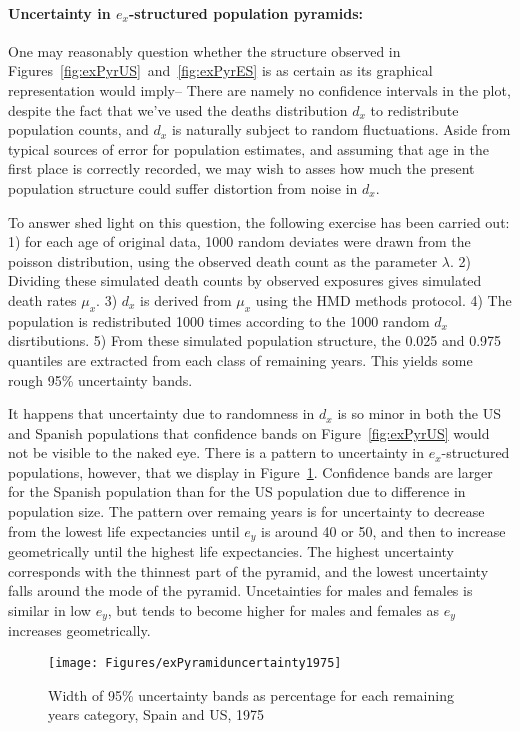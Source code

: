 \paragraph{Uncertainty in $e_x$-structured population pyramids:} One may
reasonably question whether the structure observed in
Figures~\ref{fig:exPyrUS}~and~\ref{fig:exPyrES} is as certain as its graphical
representation would imply-- There are namely no confidence intervals in the
plot, despite the fact that we've used the deaths distribution $d_x$ to
redistribute population counts, and $d_x$ is naturally subject to random
fluctuations. Aside from typical sources of error for population estimates, and
assuming that age in the first place is correctly recorded, we may wish to asses
how much the present population structure could suffer distortion from noise in
$d_x$. 

To answer shed light on this question, the following exercise has been
carried out: 1) for each age of original data, 1000 random deviates were drawn
from the poisson distribution, using the observed death count as the parameter
$\lambda$. 2) Dividing these simulated death counts by observed exposures gives
simulated death rates $\mu_x$. 3) $d_x$ is derived from $\mu_x$ using the HMD
methods protocol. 4) The population is redistributed 1000 times according to the
1000 random $d_x$ disrtibutions. 5) From these simulated population structure,
the 0.025 and 0.975 quantiles are extracted from each class of remaining years.
This yields some rough 95\% uncertainty bands.

It happens that uncertainty due to randomness in $d_x$ is so minor in both the
US and Spanish populations that confidence bands on Figure~\ref{fig:exPyrUS}
would not be visible to the naked eye. There is a pattern to uncertainty in
$e_x$-structured populations, however, that we display in
Figure~\ref{fig:PyramidUncertainty}. Confidence bands are larger for the Spanish
population than for the US population due to difference in population size. The
pattern over remaing years is for uncertainty to decrease from the lowest life
expectancies until $e_y$ is around 40 or 50, and then to
increase geometrically until the highest life expectancies. The highest
uncertainty corresponds with the thinnest part of the pyramid, and the lowest
uncertainty falls around the mode of the pyramid. Uncetainties for males and
females is similar in low $e_y$, but tends to become higher for males and
females as $e_y$ increases geometrically.

\begin{figure}
      \centering
      \caption{Width of 95\% uncertainty bands as percentage for each
      remaining years category, Spain and US, 1975}
         \texttt{[image: Figures/exPyramiduncertainty1975]}
      \label{fig:PyramidUncertainty} 
\end{figure}

